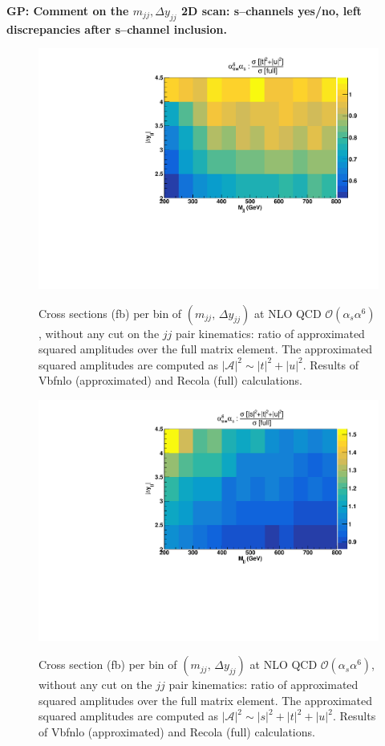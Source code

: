 {\bf GP: Comment on the $m_{jj}, \Delta y_{jj}$ 2D scan: s--channels yes/no, left discrepancies after s--channel inclusion.}
\begin{figure}[h]
\centering
{\includegraphics[scale=0.39]{figures/scanfigures/a6as_vbfnloVSrecola_tu.pdf}}
\caption{Cross sections (fb) per bin of $(m_{jj},\,\Delta y_{jj})$ at NLO QCD $\mathcal{O}(\alpha_s\alpha^6)$, without any cut on the $jj$ pair kinematics: ratio of approximated squared amplitudes over the full matrix element. The approximated squared amplitudes are computed as $|\mathcal{A}|^2 \sim |t|^2 + |u|^2$. Results of {\sc Vbfnlo} (approximated) and {\sc Recola} (full) calculations.}\label{fig:ratio2d_NLO}
\end{figure}

\begin{figure}[hbt]
\centering
{\includegraphics[scale=0.39]{figures/scanfigures/a6as_vbfnloVSrecola_stu.pdf}}
\caption{Cross section (fb) per bin of $(m_{jj},\,\Delta y_{jj})$ at NLO QCD $\mathcal{O}(\alpha_s\alpha^6)$, without any cut on the $jj$ pair kinematics:  ratio of approximated squared amplitudes over the full matrix element. The approximated squared amplitudes are computed as $|\mathcal{A}|^2 \sim |s|^2 + |t|^2 + |u|^2$. Results of {\sc Vbfnlo} (approximated) and {\sc Recola} (full) calculations.}\label{fig:mjjdyjj_2d_NLO}
\end{figure}

